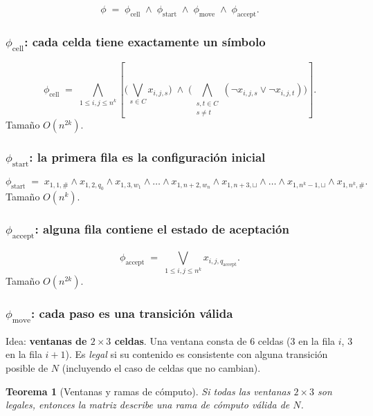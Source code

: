 \documentclass[11pt,a4paper]{article}
\theoremstyle{definicion}
\newtheorem{teorema}[definicion]{Teorema}
\begin{document}
\[
\phi \;=\; \phi_{\text{cell}} \;\land\; \phi_{\text{start}} \;\land\; \phi_{\text{move}} \;\land\; \phi_{\text{accept}}.
\]

\subsubsection*{$\phi_{\text{cell}}$: cada celda tiene exactamente un s\'imbolo}

\[
\phi_{\text{cell}} \;=\; \bigwedge_{1 \leq i, j \leq n^k} \left[ \Big(\bigvee_{s \in C} x_{i,j,s}\Big) \;\land\; \Big( \bigwedge_{\substack{s, t \in C \\ s \neq t}} (\neg x_{i,j,s} \lor \neg x_{i,j,t}) \Big) \right].
\]
Tama\~no $O(n^{2k})$.

\subsubsection*{$\phi_{\text{start}}$: la primera fila es la configuraci\'on inicial}

\[
\phi_{\text{start}} \;=\; x_{1,1,\#} \land x_{1,2,q_0} \land x_{1,3,w_1} \land \dots \land x_{1,n+2,w_n} \land x_{1,n+3,\sqcup} \land \dots \land x_{1,n^k - 1, \sqcup} \land x_{1, n^k, \#}.
\]
Tama\~no $O(n^k)$.

\subsubsection*{$\phi_{\text{accept}}$: alguna fila contiene el estado de aceptaci\'on}

\[
\phi_{\text{accept}} \;=\; \bigvee_{1 \leq i, j \leq n^k} x_{i, j, q_{\text{accept}}}.
\]
Tama\~no $O(n^{2k})$.

\subsubsection*{$\phi_{\text{move}}$: cada paso es una transici\'on v\'alida}

Idea: \textbf{ventanas de $2 \times 3$ celdas}. Una ventana consta de 6 celdas (3 en la fila $i$, 3 en la fila $i+1$). Es \emph{legal} si su contenido es consistente con alguna transici\'on posible de $N$ (incluyendo el caso de celdas que no cambian).

\begin{teorema}[Ventanas y ramas de c\'omputo]
Si todas las ventanas $2 \times 3$ son legales, entonces la matriz describe una rama de c\'omputo v\'alida de $N$.
\end{teorema}
\end{document}
